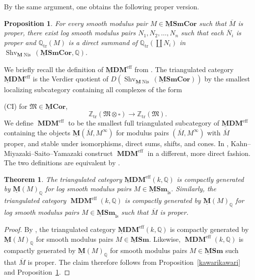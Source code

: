 \documentclass[11pt]{amsart}
\newcommand{\Q}{\mathbb{Q}}
\newcommand{\Shv}{{\operatorname{Shv}}}
\newcommand{\bZ}{\mathbb{Z}}
\newcommand{\MDM}{\operatorname{\mathbf{MDM}}}
\newcommand{\ulMDM}{\operatorname{\mathbf{\underline{M}DM}}}
\newcommand{\tr}{{\operatorname{tr}}}
\newcommand{\eff}{{\operatorname{eff}}}
\newcommand{\Nis}{{\operatorname{Nis}}}
\newcommand{\ol}{\overline}
\newcommand{\cube}{\square}
\newcommand{\M}{\mathbf{M}}
\newcommand{\ulM}{\underline{\M}}
\newcommand{\ulMCor}{\operatorname{\mathbf{\underline{M}Cor}}}
\newcommand{\ulMSm}{\operatorname{\mathbf{\underline{M}Sm}}}
\newcommand{\ulMSmCor}{\operatorname{\mathbf{\underline{M}SmCor}}}
\def\bZ{\mathbb{Z}}
\def\Ztr{\bZ_\tr}
\def\Minf{M^{\infty}}
\newcommand{\ulMSmls}{{\ulMSm}_{\text{ls}}}
\newtheorem{thm}[lemma]{Theorem}
\newtheorem{prop}[lemma]{Proposition}
\theoremstyle{definition}
\theoremstyle{remark}
\numberwithin{equation}{section}
\begin{document}
By the same argument, one obtains the following proper version.

\begin{prop}\label{joker}
For every smooth modulus pair $M\in \ulMSmCor$ such that $\ol{M}$ is proper, there exist log smooth modulus pairs $N_1,N_2,\dots,N_n$ such that each $\ol{N}_i$ is proper and $\Q_\tr(M)$ is a direct summand of $\Q_\tr(\coprod N_i)$ in $\Shv_{\ulM\Nis}(\ulMSmCor,\Q)$.
\end{prop}

We briefly recall the definition of $\ulMDM^\eff$ from \cite{KMSY22a}. The triangulated category $\ulMDM^\eff$ is the Verdier quotient of $D(\Shv_{\ulM \Nis}(\ulMSmCor))$ by the smallest localizing subcategory containing all complexes of the form

(CI) for ${\mathfrak{M}}\in\ulMCor$,
\[
\Ztr(\mathfrak{M}\otimes \cube) \to \Ztr(\mathfrak{M}).
\]
We define $\MDM^\eff$ to be the smallest full triangulated subcategory of $\ulMDM^\eff$ containing the objects $\ulM(\ol{M},\Minf)$ for modulus pairs $(\ol{M}, \Minf)$ with $\ol{M}$ proper, and stable under isomorphisms, direct sums, shifts, and cones. In \cite{KMSY22a}, Kahn--Miyazaki--Saito--Yamazaki construct $\MDM^\eff$ in a different, more direct fashion. The two definitions are equivalent by \cite[Theorem 5.2.2]{KMSY22a}.

\begin{thm}\label{lsequalsch}
The triangulated category $\ulMDM^\eff(k,\Q)$ is compactly generated by $\ulM(M)_\Q$ for log smooth modulus pairs $M \in \ulMSmls$. Similarly, the triangulated category $\MDM^\eff(k,\Q)$ is compactly generated by $\ulM(M)_\Q$ for log smooth modulus pairs $M \in \ulMSmls$ such that $\ol{M}$ is proper.
\end{thm}

\begin{proof}
By \cite[Theorem 4.1.1]{KMSY22a}, the triangulated category $\ulMDM^\eff(k,\Q)$ is compactly generated by $\ulM(M)_\Q$ for smooth modulus pairs $M\in \ulMSm$. Likewise, $\MDM^\eff(k,\Q)$ is compactly generated by $\ulM(M)_\Q$ for smooth modulus pairs $M\in \ulMSm$ such that $\ol{M}$ is proper. The claim therefore follows from Proposition~\ref{kawarikawari} and Proposition~\ref{joker}.
\end{proof}
\end{document}

